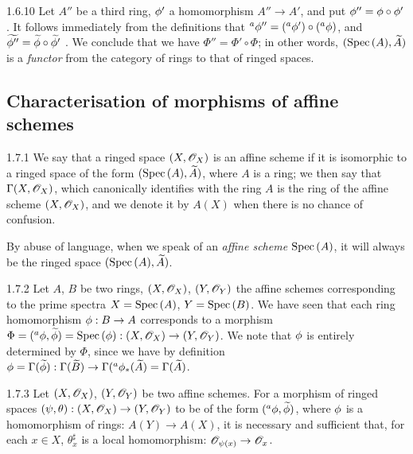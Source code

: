 \begin{env}{1.6.10}
\label{env-1.1.6.10}
Let $A''$ be a third ring, $\phi'$ a homomorphism $A''\to A'$, and put
$\phi''=\phi\circ\phi'$. It follows immediately from the definitions that
${}^a\phi''=({}^a\phi')\circ({}^a\phi)$, and
$\widetilde{\phi''}=\widetilde{\phi}\circ\widetilde{\phi'}$ . We conclude
that we have $\Phi''=\Phi'\circ\Phi$; in other words, $({\mathop{\mathrm{Spec}}\nolimits}\,(A),\widetilde{A})$ is a
\emph{functor} from the category of rings to that of ringed spaces.
\end{env}

\subsection{Characterisation of morphisms of affine schemes}
\label{1-schemes-1.7}

\begin{envs}[Definition]{1.7.1}
\label{defn-1.1.7.1}
We say that a ringed space $(X,\mathscr{O}_X)$ is an affine scheme if it is isomorphic to a ringed
space of the form $({\mathop{\mathrm{Spec}}\nolimits}\,(A),\widetilde{A})$, where $A$ is a ring; we then say that
$\Gamma(X,\mathscr{O}_X)$, which canonically identifies with the ring $A$  is the
ring of the affine scheme $(X,\mathscr{O}_X)$, and we denote it by $A(X)$ when there is no chance of
confusion.
\end{envs}

By abuse of language, when we speak of an \emph{affine scheme ${\mathop{\mathrm{Spec}}\nolimits}\,(A)$}, it will always be
the ringed space $({\mathop{\mathrm{Spec}}\nolimits}\,(A),\widetilde{A})$.

\begin{env}{1.7.2}
\label{env-1.1.7.2}
Let $A$, $B$ be two rings, $(X,\mathscr{O}_X)$, $(Y,\mathscr{O}_Y)$ the affine schemes corresponding to
the prime spectra $X={\mathop{\mathrm{Spec}}\nolimits}\,(A)$, $Y={\mathop{\mathrm{Spec}}\nolimits}\,(B)$. We have seen  that each ring
homomorphism $\phi:B\to A$ corresponds to a morphism
$\Phi=({}^a\phi,\widetilde{\phi})={\mathop{\mathrm{Spec}}\nolimits}\,(\phi):(X,\mathscr{O}_X)\to(Y,\mathscr{O}_Y)$. We note that $\phi$
is entirely determined by $\Phi$, since we have by definition
$\phi=\Gamma(\widetilde{\phi}):\Gamma(\widetilde{B})
\to\Gamma({}^a\phi_*(\widetilde{A})=\Gamma(\widetilde{A})$.
\end{env}

\begin{envs}[Theorem]{1.7.3}
\label{thm-1.1.7.3}
Let $(X,\mathscr{O}_X)$, $(Y,\mathscr{O}_Y)$ be two affine schemes. For a morphism of ringed spaces
$(\psi,\theta):(X,\mathscr{O}_X)\to(Y,\mathscr{O}_Y)$ to be of the form $({}^a\phi,\widetilde{\phi})$,
where $\phi$ is a homomorphism of rings: $A(Y)\to A(X)$, it is necessary and sufficient
that, for each $x\in X$, $\theta_x^\sharp$ is a local homomorphism: $\mathscr{O}_{\psi(x)}\to\mathscr{O}_x$.
\end{envs}

